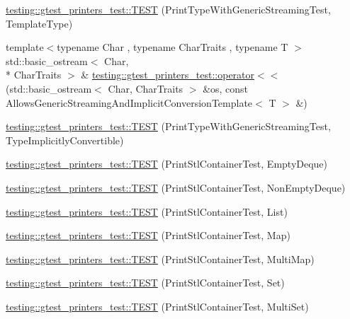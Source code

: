 \begin{DoxyCompactItemize}
\item 
\hyperlink{namespacetesting_1_1gtest__printers__test_a6e180c85f307712a995985f7bc735fd1}{testing\-::gtest\-\_\-printers\-\_\-test\-::\-T\-E\-S\-T} (Print\-Type\-With\-Generic\-Streaming\-Test, Template\-Type)
\item 
{\footnotesize template$<$typename Char , typename Char\-Traits , typename T $>$ }\\std\-::basic\-\_\-ostream$<$ Char, \\*
Char\-Traits $>$ \& \hyperlink{namespacetesting_1_1gtest__printers__test_a09eedfbca613302efe6438d2a537f419}{testing\-::gtest\-\_\-printers\-\_\-test\-::operator$<$$<$} (std\-::basic\-\_\-ostream$<$ Char, Char\-Traits $>$ \&os, const Allows\-Generic\-Streaming\-And\-Implicit\-Conversion\-Template$<$ T $>$ \&)
\item 
\hyperlink{namespacetesting_1_1gtest__printers__test_a68877c5e1ec7a53281798310c30e1776}{testing\-::gtest\-\_\-printers\-\_\-test\-::\-T\-E\-S\-T} (Print\-Type\-With\-Generic\-Streaming\-Test, Type\-Implicitly\-Convertible)
\item 
\hyperlink{namespacetesting_1_1gtest__printers__test_a1ce10b8a3634e0f6bfbfbb5888c04a95}{testing\-::gtest\-\_\-printers\-\_\-test\-::\-T\-E\-S\-T} (Print\-Stl\-Container\-Test, Empty\-Deque)
\item 
\hyperlink{namespacetesting_1_1gtest__printers__test_a249d482cf4a1525bd043489dcbd3e200}{testing\-::gtest\-\_\-printers\-\_\-test\-::\-T\-E\-S\-T} (Print\-Stl\-Container\-Test, Non\-Empty\-Deque)
\item 
\hyperlink{namespacetesting_1_1gtest__printers__test_aaa135672ff79ecaef82c6046f2ab8d29}{testing\-::gtest\-\_\-printers\-\_\-test\-::\-T\-E\-S\-T} (Print\-Stl\-Container\-Test, List)
\item 
\hyperlink{namespacetesting_1_1gtest__printers__test_a3d701a1866f260a42411e9041894c49c}{testing\-::gtest\-\_\-printers\-\_\-test\-::\-T\-E\-S\-T} (Print\-Stl\-Container\-Test, Map)
\item 
\hyperlink{namespacetesting_1_1gtest__printers__test_a8a498c956a5b1c0358d126e1ad56fac0}{testing\-::gtest\-\_\-printers\-\_\-test\-::\-T\-E\-S\-T} (Print\-Stl\-Container\-Test, Multi\-Map)
\item 
\hyperlink{namespacetesting_1_1gtest__printers__test_abdc498462741033074f8e86b7c0bd480}{testing\-::gtest\-\_\-printers\-\_\-test\-::\-T\-E\-S\-T} (Print\-Stl\-Container\-Test, Set)
\item 
\hyperlink{namespacetesting_1_1gtest__printers__test_adaa3e1cfa3feca377b3958edb41fc0f1}{testing\-::gtest\-\_\-printers\-\_\-test\-::\-T\-E\-S\-T} (Print\-Stl\-Container\-Test, Multi\-Set)

\end{DoxyCompactItemize}

